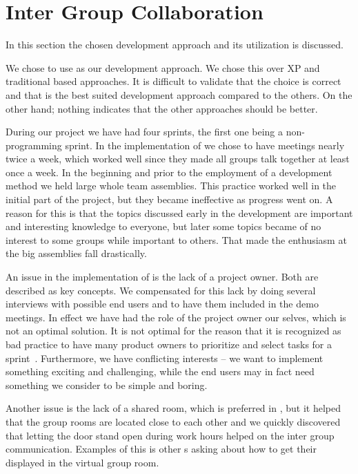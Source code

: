 \section{Inter Group Collaboration}
\label{sec:intergroup}
In this section the chosen development approach and its utilization is discussed.

We chose to use \sos{} as our development approach.
We chose this over XP and traditional based approaches.
It is difficult to validate that the choice is correct and that \sos{} is the best suited development approach compared to the others.
On the other hand; nothing indicates that the other approaches should be better. 

During our project we have had four sprints, the first one being a non-programming sprint.
In the implementation of \sos{} we chose to have \sos{} meetings nearly twice a week, which worked well since they made all groups talk together at least once a week. 
In the beginning and prior to the employment of a development method we held large whole team assemblies. 
This practice worked well in the initial part of the project, but they became ineffective as progress went on. 
A reason for this is that the topics discussed early in the development are important and interesting knowledge to everyone, but later some topics became of no interest to some groups while important to others.
That made the enthusiasm at the big assemblies fall drastically. 


An issue in the implementation of \sos{} is the lack of a project owner. 
Both are described as key concepts. 
We compensated for this lack by doing several interviews with possible end users and to have them included in the demo meetings. 
In effect we have had the role of the project owner our selves, which is not an optimal solution. 
It is not optimal for the reason that it is recognized as bad \scrum{} practice to have many product owners to prioritize and select tasks for a sprint~\cite[p.~128]{Larman04}. 
Furthermore, we have conflicting interests -- we want to implement something exciting and challenging, while the end users may in fact need something we consider to be simple and boring.


Another issue is the lack of a shared room, which is preferred in \sos{}, but it helped that the group rooms are located close to each other and we quickly discovered that letting the door stand open during work hours helped on the inter group communication. 
Examples of this is other \subgroup{}s asking about how to get their \block{} displayed in the virtual group room.

